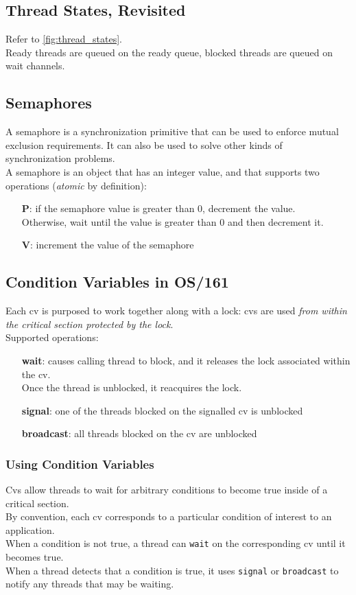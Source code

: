 \documentclass[12pt]{article}
\theoremstyle{plain}
\theoremstyle{definition}
\begin{document}
\subsection{Thread States, Revisited}
Refer to \ref{fig:thread_states}. \\
Ready threads are queued on the ready queue, blocked threads are queued on wait channels.

\subsection{Semaphores}
A semaphore is a synchronization primitive that can be used to enforce mutual exclusion requirements.
It can also be used to solve other kinds of synchronization problems. \\

A semaphore is an object that has an integer value, and that supports two operations (\emph{atomic} by definition):
\begin{itemize}
  \item[\textbf{P}:] if the semaphore value is greater than 0, decrement the value. \\
  Otherwise, wait until the value is greater than 0 and then decrement it.
  \item[\textbf{V}:] increment the value of the semaphore
\end{itemize}

\subsection{Condition Variables in OS/161}
Each cv is purposed to work together along with a lock: cvs are used \emph{from within the critical section protected by the lock}. \\
Supported operations:
\begin{itemize}
  \item[\textbf{wait}:] causes calling thread to block, and it releases the lock associated within the cv. \\
  Once the thread is unblocked, it reacquires the lock.
  \item[\textbf{signal}:] one of the threads blocked on the signalled cv is unblocked
  \item[\textbf{broadcast}:] all threads blocked on the cv are unblocked
\end{itemize}

\subsubsection{Using Condition Variables}
Cvs allow threads to wait for arbitrary conditions to become true inside of a critical section. \\
By convention, each cv corresponds to a particular condition of interest to an application. \\
When a condition is not true, a thread can \texttt{wait} on the corresponding cv until it becomes true. \\
When a thread detects that a condition is true, it uses \texttt{signal} or \texttt{broadcast} to notify any threads that may be waiting. \\
\end{document}
